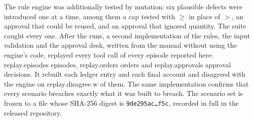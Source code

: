 The rule engine was additionally tested by mutation: six plausible defects were
introduced one at a time, among them a cap tested with $\geq$ in place of $>$, an
approval that could be reused, and an approval that ignored quantity. The suite caught every one. After the runs, a second implementation of the rules,
the input validation and the approval desk, written from the manual without using
the engine's code, replayed every tool call of every episode reported here:
\num{replay.episodes} episodes, \num{replay.orders} orders and
\num{replay.approvals} approval decisions. It rebuilt each ledger entry and each
final account and disagreed with the engine on \num{replay.disagree.w} of them. The
same implementation confirms that every scenario breaches exactly what it was
built to breach. The scenario set is frozen to a file whose SHA-256 digest is
\texttt{9de295ac\ldots f5c}, recorded in full in the released repository.
